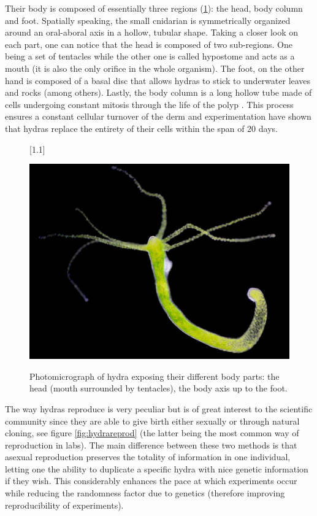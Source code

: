 Their body is composed of essentially three regions (\ref{fig:hydrabody}): the head, body column and foot. Spatially speaking, the small cnidarian is symmetrically organized around an oral-aboral axis in a hollow, tubular shape. Taking a closer look on each part, one can notice that the head is composed of two sub-regions. One being a set of tentacles while the other one is called hypostome and acts as a mouth (it is also the only orifice in the whole organism). The foot, on the other hand is composed of a basal disc that allows hydras to stick to underwater leaves and rocks (among others). Lastly, the body column is a long hollow tube made of cells undergoing constant mitosis through the life of the polyp . This process ensures a constant cellular turnover of the derm and experimentation have shown that hydras replace the entirety of their cells within the span of 20 days.

\begin{figure}[h]
	[1.1\FBwidth]
	{\caption{Photomicrograph of hydra exposing their different body parts: the head (mouth surrounded by tentacles), the body axis up to the foot.  }\label{fig:hydrabody}}
	{\includegraphics[width=0.9\linewidth]{figures/hydra.png}}
\end{figure}

\begin{remark}
	The way hydras reproduce is very peculiar but is of great interest to the scientific community since they are able to give birth either sexually or through natural cloning, see figure \ref{fig:hydrareprod} (the latter being the most common way of reproduction in labs). The main difference between these two methods is that asexual reproduction preserves the totality of information in one individual, letting one the ability to duplicate a specific hydra with nice genetic information if they wish. This considerably enhances the pace at which experiments occur while reducing the randomness factor due to genetics (therefore improving reproducibility of experiments). 
\end{remark}

